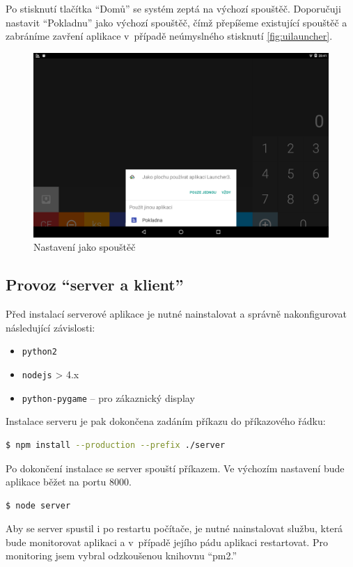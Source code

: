 \documentclass[a4paper,11pt,oneside]{article}
\begin{document}
Po stisknutí tlačítka \enquote{Domů} se systém zeptá na výchozí spouštěč. Doporučuji nastavit \enquote{Pokladnu} jako výchozí spouštěč, čímž přepíšeme existující spouštěč a zabráníme zavření aplikace v~případě neúmyslného stisknutí \eqref{fig:uilauncher}.

\begin{figure}[H]
	\centering
	\includegraphics[width=0.6\linewidth]{../ui_launcher}
	\caption{Nastavení jako spouštěč}
	\label{fig:uilauncher}
\end{figure}

\subsection{Provoz \enquote{server a klient}}
Před instalací serverové aplikace je nutné nainstalovat a správně nakonfigurovat následující závislosti:

\begin{itemize}
	\item \lstinline|python2|
	\item \lstinline|nodejs| > 4.x
	\item \lstinline|python-pygame| -- pro zákaznický display
\end{itemize}
Instalace serveru je pak dokončena zadáním příkazu do příkazového řádku:

\begin{lstlisting}[language=bash, caption={Bash}]
$ npm install --production --prefix ./server
\end{lstlisting}

Po dokončení instalace se server spouští příkazem. Ve výchozím nastavení bude aplikace běžet na portu 8000. 

\begin{lstlisting}[language=bash, caption={Bash}]
$ node server
\end{lstlisting}

Aby se server spustil i po restartu počítače, je nutné nainstalovat službu, která bude monitorovat aplikaci a v~případě jejího pádu aplikaci restartovat. Pro monitoring jsem vybral odzkoušenou knihovnu \enquote{pm2.}
\end{document}
